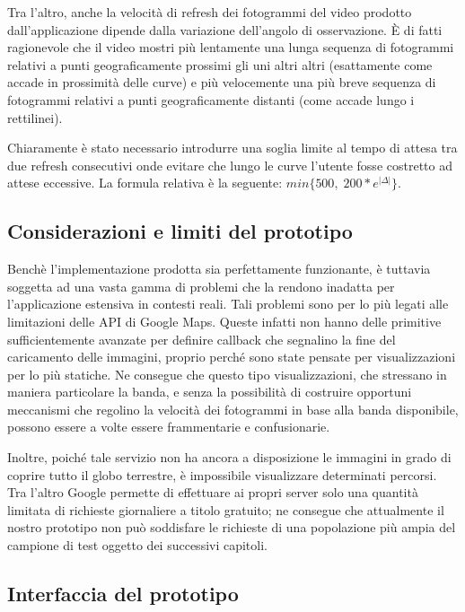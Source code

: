 \documentclass[12pt,a4paper,openright, notitlepage]{report}
\begin{document}
Tra l’altro, anche la velocità di refresh dei fotogrammi del video prodotto dall’applicazione dipende dalla variazione dell’angolo di osservazione. È di fatti ragionevole che il video mostri più lentamente una lunga sequenza di fotogrammi relativi a punti geograficamente prossimi gli uni altri altri (esattamente come accade in prossimità delle curve) e più velocemente una più breve sequenza di fotogrammi relativi a punti geograficamente distanti (come accade lungo i rettilinei). 

Chiaramente è stato necessario introdurre una soglia limite al tempo di attesa tra due refresh consecutivi onde evitare che lungo le curve l’utente fosse costretto ad attese eccessive. La formula relativa è la seguente: $min\{ 500, \; 200*e^{|\Delta|} \}$.

\subsection{Considerazioni e limiti del prototipo}

Benchè l’implementazione prodotta sia perfettamente funzionante, è tuttavia soggetta ad una vasta gamma di problemi che la rendono inadatta per l’applicazione estensiva in contesti reali. Tali problemi sono per lo più legati alle limitazioni delle API di Google Maps. Queste infatti non hanno delle primitive sufficientemente avanzate per definire callback che segnalino la fine del caricamento delle immagini, proprio perché sono state pensate per visualizzazioni per lo più statiche. Ne consegue che questo tipo visualizzazioni, che stressano in maniera particolare la banda, e senza la possibilità di costruire opportuni meccanismi che regolino la velocità dei fotogrammi in base alla banda disponibile, possono essere a volte essere frammentarie e confusionarie.

Inoltre, poiché tale servizio non ha ancora a disposizione le immagini in grado di coprire tutto il globo terrestre, è impossibile visualizzare determinati percorsi. Tra l’altro Google permette di effettuare ai propri server solo una quantità limitata di richieste giornaliere a titolo gratuito; ne consegue che attualmente il nostro prototipo non può soddisfare le richieste di una popolazione più ampia del campione di test oggetto dei successivi capitoli.

\subsection{Interfaccia del prototipo}
\end{document}
